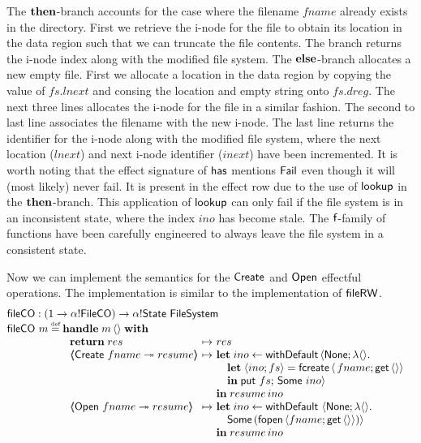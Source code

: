 \documentclass[12pt,phd,lfcs,twoside,openright,logo,leftchapter,normalheadings]{infthesis}
\theoremstyle{plain}
\theoremstyle{definition}
\begin{document}
%
The $\mathbf{then}$-branch accounts for the case where the filename $fname$
already exists in the directory. First we retrieve the i-node for the
file to obtain its location in the data region such that we can
truncate the file contents.
%
The branch returns the i-node index along with the modified file
system. The $\mathbf{else}$-branch allocates a new empty file. First we
allocate a location in the data region by copying the value of
$fs.lnext$ and consing the location and empty string onto
$fs.dreg$. The next three lines allocates the i-node for the file in a
similar fashion. The second to last line associates the filename with
the new i-node. The last line returns the identifier for the i-node
along with the modified file system, where the next location ($lnext$)
and next i-node identifier ($inext$) have been incremented.
%
It is worth noting that the effect signature of $\mathsf{has}$ mentions
$\mathsf{Fail}$ even though it will (most likely) never fail. It is present in
the effect row due to the use of $\mathsf{lookup}$ in the $\mathbf{then}$-branch. This
application of $\mathsf{lookup}$ can only fail if the file system is in an
inconsistent state, where the index $ino$ has become stale. The
$\mathsf{f}$-family of functions have been carefully engineered to always
leave the file system in a consistent state.
%

Now we can implement the semantics for the $\mathsf{Create}$ and $\mathsf{Open}$
effectful operations. The implementation is similar to the
implementation of $\mathsf{fileRW}$.
%
\[
  \bl
    \fileAlloc : (\UnitType \to \alpha \eff \dec{FileCO}) \to \alpha \eff \State~\FileSystem\\
    \fileAlloc~m \defas
        \ba[t]{@{}l}
           \Handle\;m\,\Unit\;\With\\
             ~\ba{@{~}l@{~}c@{~}l}
                 \Return\;res      &\mapsto& res\\
                 \OpCase{\UCreate}{fname}{resume} &\mapsto&
                   \bl
                     \Let\;ino \revto \faild\,\Record{\None; \lambda\Unit.\\
                       \quad\bl
                         \Let\;\Record{ino;fs} = \fcreate\,\Record{\,fname;\Uget\,\Unit}\\
                         \In\;\Uput~fs;\,\Some~ino}
                       \el\\
                     \In\; resume\,ino
                   \el\\
                 \OpCase{\UOpen}{fname}{resume} &\mapsto&
                   \ba[t]{@{}l}
                      \Let\; ino \revto \faild~\Record{\None; \lambda \Unit.\\
                        \quad\Some\,(\fopen\,\Record{fname;\Uget\,\Unit})}\\
                      \In\;resume\,ino
                   \ea
               \ea
         \ea
  \el
\]
%
\end{document}
